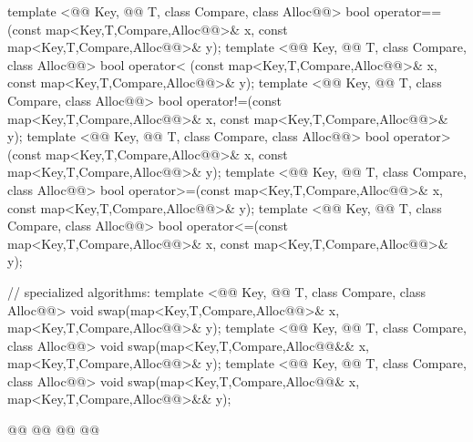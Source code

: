 \documentclass[american,twoside]{book}
\begin{document}
\begin{codeblock}
{  template <@@ Key, @@ T, class Compare, class Alloc@@>
    bool operator==(const map<Key,T,Compare,Alloc@@>& x,
                    const map<Key,T,Compare,Alloc@@>& y);
  template <@@ Key, @@ T, class Compare, class Alloc@@>
    bool operator< (const map<Key,T,Compare,Alloc@@>& x,
                    const map<Key,T,Compare,Alloc@@>& y);
  template <@@ Key, @@ T, class Compare, class Alloc@@>
    bool operator!=(const map<Key,T,Compare,Alloc@@>& x,
                    const map<Key,T,Compare,Alloc@@>& y);
  template <@@ Key, @@ T, class Compare, class Alloc@@>
    bool operator> (const map<Key,T,Compare,Alloc@@>& x,
                    const map<Key,T,Compare,Alloc@@>& y);
  template <@@ Key, @@ T, class Compare, class Alloc@@>
    bool operator>=(const map<Key,T,Compare,Alloc@@>& x,
                    const map<Key,T,Compare,Alloc@@>& y);
  template <@@ Key, @@ T, class Compare, class Alloc@@>
    bool operator<=(const map<Key,T,Compare,Alloc@@>& x,
                    const map<Key,T,Compare,Alloc@@>& y);

  // specialized algorithms:
  template <@@ Key, @@ T, class Compare, class Alloc@@>
    void swap(map<Key,T,Compare,Alloc@@>& x,
              map<Key,T,Compare,Alloc@@>& y);
  template <@@ Key, @@ T, class Compare, class Alloc@@>
    void swap(map<Key,T,Compare,Alloc@@&& x,
              map<Key,T,Compare,Alloc@@>& y);
  template <@@ Key, @@ T, class Compare, class Alloc@@>
    void swap(map<Key,T,Compare,Alloc@@& x,
              map<Key,T,Compare,Alloc@@>&& y);

  @@
    @@
      @@
        @@
}
\end{codeblock}%
\end{document}
